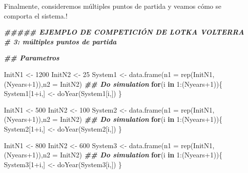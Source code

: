 \documentclass[
]{article}
\newenvironment{Shaded}{\begin{snugshade}}{\end{snugshade}}
\newcommand{\AttributeTok}[1]{\textcolor[rgb]{0.77,0.63,0.00}{#1}}
\newcommand{\ControlFlowTok}[1]{\textcolor[rgb]{0.13,0.29,0.53}{\textbf{#1}}}
\newcommand{\DecValTok}[1]{\textcolor[rgb]{0.00,0.00,0.81}{#1}}
\newcommand{\DocumentationTok}[1]{\textcolor[rgb]{0.56,0.35,0.01}{\textbf{\textit{#1}}}}
\newcommand{\FunctionTok}[1]{\textcolor[rgb]{0.00,0.00,0.00}{#1}}
\newcommand{\NormalTok}[1]{#1}
\newcommand{\OtherTok}[1]{\textcolor[rgb]{0.56,0.35,0.01}{#1}}
\newcommand{\SpecialCharTok}[1]{\textcolor[rgb]{0.00,0.00,0.00}{#1}}
\begin{document}
Finalmente, consideremos múltiples puntos de partida y veamos cómo se
comporta el sistema.!

\begin{Shaded}
\begin{Highlighting}[]
\DocumentationTok{\#\#\#\#\# EJEMPLO DE COMPETICIÓN DE LOTKA VOLTERRA \# 3: múltiples puntos de partida}

\DocumentationTok{\#\# Parametros}


\NormalTok{InitN1 }\OtherTok{\textless{}{-}} \DecValTok{1200}
\NormalTok{InitN2 }\OtherTok{\textless{}{-}} \DecValTok{25}
\NormalTok{System1 }\OtherTok{\textless{}{-}} \FunctionTok{data.frame}\NormalTok{(}\AttributeTok{n1 =} \FunctionTok{rep}\NormalTok{(InitN1,(Nyears}\SpecialCharTok{+}\DecValTok{1}\NormalTok{)),}\AttributeTok{n2 =}\NormalTok{ InitN2)}
\DocumentationTok{\#\# Do simulation}
\ControlFlowTok{for}\NormalTok{(i }\ControlFlowTok{in} \DecValTok{1}\SpecialCharTok{:}\NormalTok{(Nyears}\SpecialCharTok{+}\DecValTok{1}\NormalTok{))\{}
\NormalTok{  System1[}\DecValTok{1}\SpecialCharTok{+}\NormalTok{i,] }\OtherTok{\textless{}{-}} \FunctionTok{doYear}\NormalTok{(System1[i,])}
\NormalTok{\}}

\NormalTok{InitN1 }\OtherTok{\textless{}{-}} \DecValTok{500}
\NormalTok{InitN2 }\OtherTok{\textless{}{-}} \DecValTok{100}
\NormalTok{System2 }\OtherTok{\textless{}{-}} \FunctionTok{data.frame}\NormalTok{(}\AttributeTok{n1 =} \FunctionTok{rep}\NormalTok{(InitN1,(Nyears}\SpecialCharTok{+}\DecValTok{1}\NormalTok{)),}\AttributeTok{n2 =}\NormalTok{ InitN2)}
\DocumentationTok{\#\# Do simulation}
\ControlFlowTok{for}\NormalTok{(i }\ControlFlowTok{in} \DecValTok{1}\SpecialCharTok{:}\NormalTok{(Nyears}\SpecialCharTok{+}\DecValTok{1}\NormalTok{))\{}
\NormalTok{  System2[}\DecValTok{1}\SpecialCharTok{+}\NormalTok{i,] }\OtherTok{\textless{}{-}} \FunctionTok{doYear}\NormalTok{(System2[i,])}
\NormalTok{\}}


\NormalTok{InitN1 }\OtherTok{\textless{}{-}} \DecValTok{800}
\NormalTok{InitN2 }\OtherTok{\textless{}{-}} \DecValTok{600}
\NormalTok{System3 }\OtherTok{\textless{}{-}} \FunctionTok{data.frame}\NormalTok{(}\AttributeTok{n1 =} \FunctionTok{rep}\NormalTok{(InitN1,(Nyears}\SpecialCharTok{+}\DecValTok{1}\NormalTok{)),}\AttributeTok{n2 =}\NormalTok{ InitN2)}
\DocumentationTok{\#\# Do simulation}
\ControlFlowTok{for}\NormalTok{(i }\ControlFlowTok{in} \DecValTok{1}\SpecialCharTok{:}\NormalTok{(Nyears}\SpecialCharTok{+}\DecValTok{1}\NormalTok{))\{}
\NormalTok{  System3[}\DecValTok{1}\SpecialCharTok{+}\NormalTok{i,] }\OtherTok{\textless{}{-}} \FunctionTok{doYear}\NormalTok{(System3[i,])}
\NormalTok{\}}
\end{Highlighting}
\end{Shaded}
\end{document}
